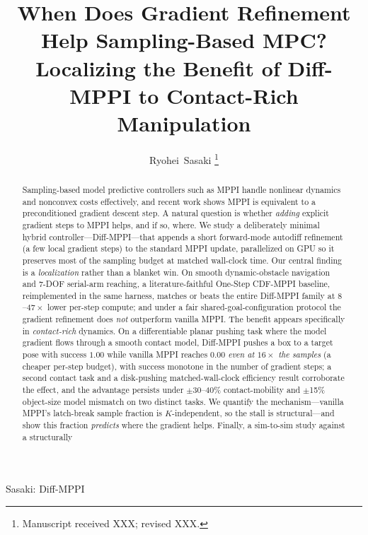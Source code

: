 \documentclass[journal]{IEEEtran}
\begin{document}
\title{When Does Gradient Refinement Help Sampling-Based MPC?\\
Localizing the Benefit of Diff-MPPI to Contact-Rich Manipulation}

\author{Ryohei~Sasaki%
\thanks{Manuscript received XXX; revised XXX.}%
}

%
{Sasaki: Diff-MPPI}

\maketitle

\begin{abstract}
Sampling-based model predictive controllers such as MPPI handle nonlinear
dynamics and nonconvex costs effectively, and recent work shows MPPI is
equivalent to a preconditioned gradient descent step. A natural question is
whether \emph{adding} explicit gradient steps to MPPI helps, and if so, where.
We study a deliberately minimal hybrid controller---Diff-MPPI---that appends a
short forward-mode autodiff refinement (a few local gradient steps) to the
standard MPPI update, parallelized on GPU so it preserves most of the sampling
budget at matched wall-clock time. Our central finding is a \emph{localization}
rather than a blanket win. On smooth dynamic-obstacle navigation and 7-DOF
serial-arm reaching, a literature-faithful One-Step CDF-MPPI baseline,
reimplemented in the same harness, matches or beats the entire Diff-MPPI family
at $8$--$47\times$ lower per-step compute; and under a fair shared-goal-configuration
protocol the gradient refinement does \emph{not} outperform vanilla MPPI. The
benefit appears specifically in \emph{contact-rich} dynamics. On a
differentiable planar pushing task where the model gradient flows through a
smooth contact model, Diff-MPPI pushes a box to a target pose with success
$1.00$ while vanilla MPPI reaches $0.00$ \emph{even at $16\times$ the samples}
(a cheaper per-step budget), with success monotone in the number of gradient
steps; a second contact task and a disk-pushing matched-wall-clock efficiency
result corroborate the effect, and the advantage persists under $\pm$30--40\%
contact-mobility and $\pm$15\% object-size model mismatch on two distinct tasks.
We quantify the mechanism---vanilla MPPI's latch-break sample fraction is
$K$-independent, so the stall is structural---and show this fraction \emph{predicts}
where the gradient helps. Finally, a sim-to-sim study against a structurally

\end{abstract}
\end{document}
